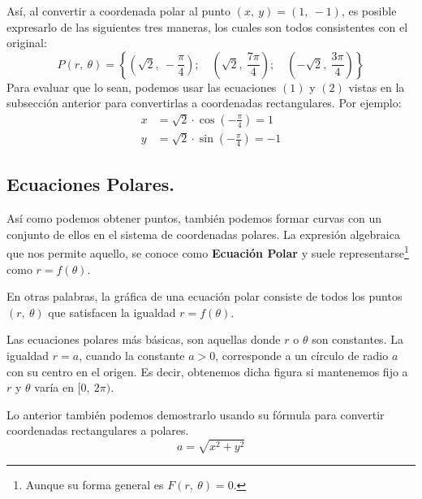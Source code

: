 \documentclass[12pt]{article}
\begin{document}
Así, al convertir a coordenada polar al punto $(x, \ y) = (1, \ -1)$, es posible expresarlo de las siguientes tres maneras, los cuales son todos consistentes con el original:
\[
  P(r, \ \theta) = \left\{
                     \left(\sqrt{2}, \ -\frac{\pi}{4}\right); \quad
                     \left(\sqrt{2}, \ \frac{7\pi}{4}\right); \quad
                     \left(-\sqrt{2}, \ \frac{3\pi}{4}\right)
                   \right\}
\]
Para evaluar que lo sean, podemos usar las ecuaciones $(1)$ y $(2)$ vistas en la subsección anterior para convertirlas a coordenadas rectangulares. Por ejemplo:
\begin{align*}
  x &= \sqrt{2} \cdot \cos\left(-\frac{\pi}{4}\right) = 1 \\
  y &= \sqrt{2} \cdot \sin\left(-\frac{\pi}{4}\right) = -1
\end{align*}

\subsection{Ecuaciones Polares.}

Así como podemos obtener puntos, también podemos formar curvas con un conjunto de ellos en el sistema de coordenadas polares. La expresión algebraica que nos permite aquello, se conoce como \textbf{Ecuación Polar} y suele representarse\footnote{Aunque su forma general es $F(r, \ \theta) = 0$.} como $r = f(\theta)$.

En otras palabras, la gráfica de una ecuación polar consiste de todos los puntos $(r, \ \theta)$ que satisfacen la igualdad $r = f(\theta)$.

Las ecuaciones polares más básicas, son aquellas donde $r$ o $\theta$ son constantes. La igualdad $r = a$, cuando la constante $a > 0$, corresponde a un círculo de radio $a$ con su centro en el origen. Es decir, obtenemos dicha figura si mantenemos fijo a $r$ y $\theta$ varía en $[0, \ 2\pi)$.

Lo anterior también podemos demostrarlo usando su fórmula para convertir coordenadas rectangulares a polares.
\[
  a = \sqrt{x^{2} + y^{2}}
\]
\end{document}
